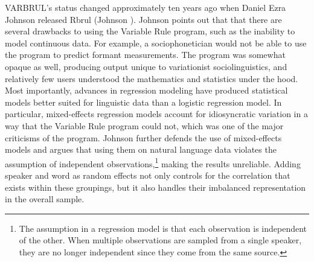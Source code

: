 VARBRUL’s status changed approximately ten years ago when Daniel Ezra Johnson released Rbrul (Johnson \citeyear{johnson_2009}). Johnson points out that that there are several drawbacks to using the Variable Rule program, such as the inability to model continuous data. For example, a sociophonetician would not be able to use the program to predict formant measurements. The program was somewhat opaque as well, producing output unique to variationist sociolinguistics, and relatively few users understood the mathematics and statistics under the hood. Most importantly, advances in regression modeling have produced statistical models better suited for linguistic data than a logistic regression model. In particular, mixed-effects regression models account for idiosyncratic variation in a way that the Variable Rule program could not, which was one of the major criticisms of the program. Johnson \citeyearpar{johnson_2014} further defends the use of mixed-effects models and argues that using them on natural language data violates the assumption of independent observations,\footnote{The assumption in a regression model is that each observation is independent of the other. When multiple observations are sampled from a single speaker, they are no longer independent since they come from the same source.} making the results unreliable. Adding speaker and word as random effects not only controls for the correlation that exists within these groupings, but it also handles their imbalanced representation in the overall sample.

